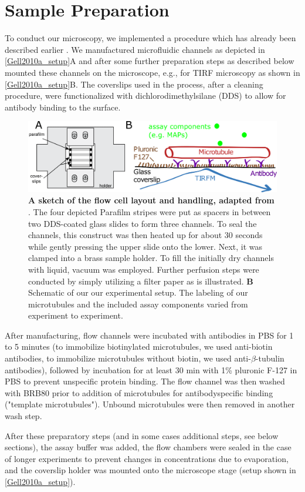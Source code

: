 \section{Sample Preparation}
\label{assayPREP}
To conduct our microscopy, we implemented a procedure which has already been described earlier \parencite{Gell2010a}. We manufactured microfluidic channels as depicted in \autoref{Gell2010a_setup}A and after some further preparation steps as described below mounted these channels on the microscope, e.g., for TIRF microscopy as shown in \autoref{Gell2010a_setup}B. The coverslips used in the process, after a cleaning procedure, were functionalized with dichlorodimethylsilane (DDS) to allow for antibody binding to the surface.\par
\begin{figure}[htb]
\centering
\includegraphics[scale=1.1]{Figures/setup.png}
\caption[The flow cell layout and handling, adapted from \parencite{Gell2010a}.]{
		\textbf{A sketch of the flow cell layout and handling, adapted from \parencite{Gell2010a}}. The four depicted Parafilm stripes were put as spacers in between two DDS-coated glass slides to form three channels. To seal the channels, this construct was then heated up for about 30 seconds while gently pressing the upper slide onto the lower. Next, it was clamped into a brass sample holder. To fill the initially dry channels with liquid, vacuum was employed. Further perfusion steps were conducted by simply utilizing a filter paper as is illustrated. \textbf{B} Schematic of our our experimental setup. The labeling of our microtubules and the included assay components varied from experiment to experiment. 
	}\label{Gell2010a_setup}
\end{figure}
After manufacturing, flow channels were incubated with antibodies in PBS for 1 to 5 minutes (to immobilize biotinylated microtubules, we used anti-biotin antibodies, to immobilize microtubules without biotin, we used anti-$\beta$-tubulin antibodies), followed by incubation for at least 30 min with 1\% pluronic F-127 in PBS to prevent unspecific protein binding. The flow channel was then washed with BRB80 prior to addition of microtubules for antibodyspecific binding ("template microtubules"). Unbound microtubules were then removed in another wash step.\par
After these preparatory steps (and in some cases additional steps, see below sections), the assay buffer was added, the flow chambers were sealed in the case of longer experiments to prevent changes in concentrations due to evaporation, and the coverslip holder was mounted onto the microscope stage (setup shown in \autoref{Gell2010a_setup}).

